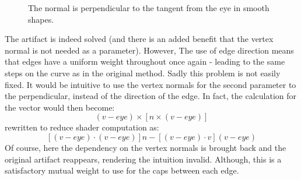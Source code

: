 \documentclass[a4paper,10pt]{article}
\begin{document}
\begin{figure}[htbp!]
  \centering
  \caption{The normal is perpendicular to the tangent from the eye in smooth shapes.}
  \label{gaze}
\end{figure}


The artifact is indeed solved (and there is an added benefit that the vertex normal is not needed as a parameter). However, The use of edge direction means that edges have a uniform weight throughout once again - leading to the same steps on the curve as in the original method. Sadly this problem is not easily fixed. It would be intuitive to use the vertex normals for the second parameter to the perpendicular, instead of the direction of the edge. In fact, the calculation for the vector would then become:
$$(v-eye) \times [n \times (v-eye)]$$
rewritten to reduce shader computation as:
$$[(v-eye) \cdot (v-eye)]n - [(v-eye) \cdot v](v-eye)$$
Of course, here the dependency on the vertex normals is brought back and the original artifact reappears, rendering the intuition invalid. Although, this is a satisfactory mutual weight to use for the caps between each edge.
\end{document}
